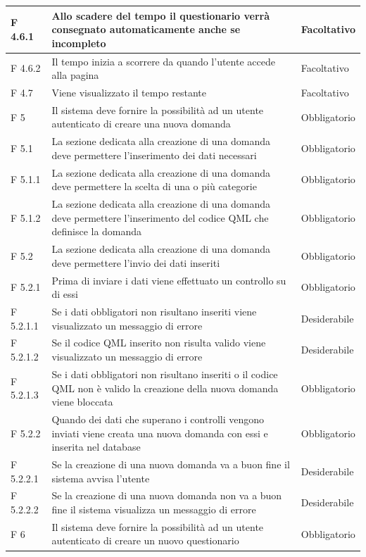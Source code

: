 \documentclass[a4paper,11pt]{article}
\begin{document}
\begin{longtable}{p{}p{}p{}}
\midrule
F 4.6.1 & Allo scadere del tempo il questionario verrà consegnato automaticamente anche se incompleto & Facoltativo\\
\midrule
F 4.6.2 & Il tempo inizia a scorrere da quando l'utente accede alla pagina & Facoltativo\\
\midrule
F 4.7 & Viene visualizzato il tempo restante & Facoltativo\\
\midrule
F 5 & Il sistema deve fornire la possibilità ad un utente autenticato di creare una nuova domanda & Obbligatorio\\
\midrule
F 5.1 & La sezione dedicata alla creazione di una domanda deve permettere l'inserimento dei dati necessari & Obbligatorio\\
\midrule
F 5.1.1 & La sezione dedicata alla creazione di una domanda deve permettere la scelta di una o più categorie & Obbligatorio\\
\midrule
F 5.1.2 & La sezione dedicata alla creazione di una domanda deve permettere l'inserimento del codice QML che definisce la domanda & Obbligatorio\\
\midrule
F 5.2 & La sezione dedicata alla creazione di una domanda deve permettere l'invio dei dati inseriti & Obbligatorio\\
\midrule
F 5.2.1 & Prima di inviare i dati viene effettuato un controllo su di essi & Obbligatorio\\
\midrule
F 5.2.1.1 & Se i dati obbligatori non risultano inseriti viene visualizzato un messaggio di errore & Desiderabile\\
\midrule
F 5.2.1.2 & Se il codice QML inserito non risulta valido viene visualizzato un messaggio di errore & Desiderabile\\
\midrule
F 5.2.1.3 & Se i dati obbligatori non risultano inseriti o il codice QML non è valido la creazione della nuova domanda viene bloccata & Obbligatorio\\
\midrule
F 5.2.2 & Quando dei dati che superano i controlli vengono inviati viene creata una nuova domanda con essi e inserita nel database & Obbligatorio\\
\midrule
F 5.2.2.1 & Se la creazione di una nuova domanda va a buon fine il sistema avvisa l'utente & Desiderabile\\
\midrule
F 5.2.2.2 & Se la creazione di una nuova domanda non va a buon fine il sistema visualizza un messaggio di errore & Desiderabile\\
\midrule
F 6 & Il sistema deve fornire la possibilità ad un utente autenticato di creare un nuovo questionario & Obbligatorio\\

\end{longtable}
\end{document}
